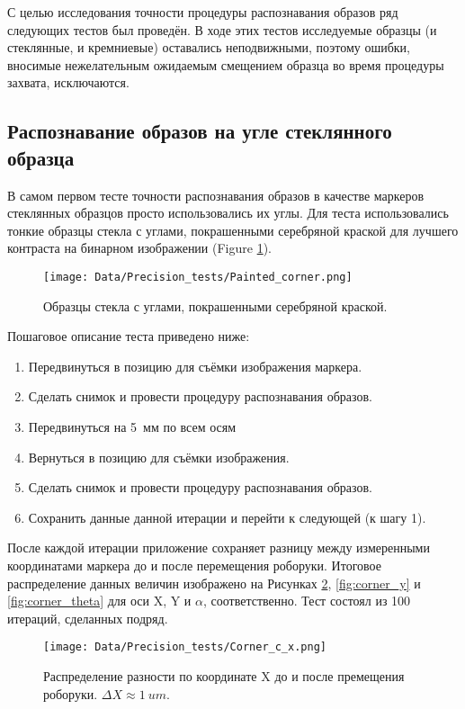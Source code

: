 С целью исследования точности процедуры распознавания образов ряд следующих тестов был проведён. В ходе этих тестов исследуемые образцы (и стеклянные, и кремниевые) оставались неподвижными, поэтому ошибки, вносимые нежелательным ожидаемым смещением образца во время процедуры захвата, исключаются.

\subsection{Распознавание образов на угле стеклянного образца}

В самом первом тесте точности распознавания образов в качестве маркеров стеклянных образцов просто использовались их углы. Для теста использовались тонкие образцы стекла с углами, покрашенными серебряной краской для лучшего контраста на бинарном изображении (Figure \ref{fig:painted_corner}).

\begin{figure}[ht]\centering
\texttt{[image: Data/Precision\_tests/Painted\_corner.png]}
\caption{Образцы стекла с углами, покрашенными серебряной краской.}
\label{fig:painted_corner}
\end{figure}

Пошаговое описание теста приведено ниже:

\begin{enumerate}
\setlength\itemsep{-0.5em}
\item Передвинуться в позицию для съёмки изображения маркера.
\item Сделать снимок и провести процедуру распознавания образов.
\item Передвинуться на 5~мм по всем осям
\item Вернуться в позицию для съёмки изображения.
\item Сделать снимок и провести процедуру распознавания образов.
\item Сохранить данные данной итерации и перейти к следующей (к шагу 1).
\end{enumerate}

После каждой итерации приложение сохраняет разницу между измеренными координатами маркера до и после перемещения роборуки. Итоговое распределение данных величин изображено на Рисунках \ref{fig:corner_x}, \ref{fig:corner_y} и \ref{fig:corner_theta} для оси X, Y и $\alpha$, соответственно. Тест состоял из 100 итераций, сделанных подряд.

\begin{figure}[ht]\centering
\texttt{[image: Data/Precision\_tests/Corner\_c\_x.png]}
\caption{Распределение разности по координате X до и после премещения роборуки. $\Delta X \approx 1~um$. }
\label{fig:corner_x}
\end{figure}

